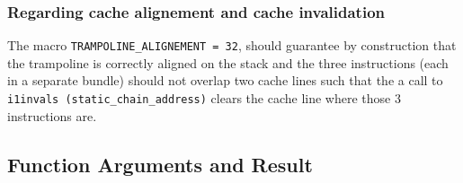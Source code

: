 \subsubsection{Regarding cache alignement and cache invalidation}

The macro \texttt{TRAMPOLINE\_ALIGNEMENT = 32}, should guarantee by
construction that the trampoline is correctly aligned on the stack and the
three instructions (each in a separate bundle) should not overlap two cache
lines such that the a call to \texttt{i1invals (static\_chain\_address)}
clears the cache line where those $3$ instructions are.

\subsection{Function Arguments and Result}

